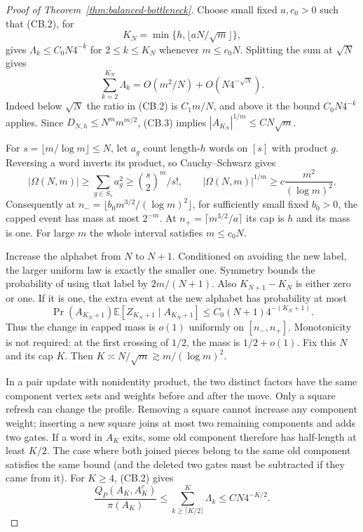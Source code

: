 \begin{proof}[Proof of Theorem~\ref{thm:balanced-bottleneck}]
Choose small fixed $a,c_0>0$ such that (CB.2), for
\[
 K_N=\min\{h,\lfloor aN/\sqrt m\rfloor\},
\]
gives $\Lambda_k\le C_0N4^{-k}$ for $2\le k\le K_N$ whenever
$m\le c_0N$.  Splitting the sum at $\sqrt N$ gives
\[
 \sum_{k=2}^{K_N}\Lambda_k
   =O(m^2/N)+O(N4^{-\sqrt N}).
\]
Indeed below $\sqrt N$ the ratio in (CB.2) is $C_1m/N$, and above it
the bound $C_0N4^{-k}$ applies.  Since $D_{N,h}\le N^m m^{m/2}$,
(CB.3) implies $|A_{K_N}|^{1/m}\le C N\sqrt m$.

For $s=\lfloor m/\log m\rfloor\le N$, let $a_g$ count length-$h$
words on $[s]$ with product $g$.  Reversing a word inverts its product,
so Cauchy--Schwarz gives
\[
 |\Omega(N,m)|\ge\sum_{g\in S_s}a_g^2
       \ge\binom s2^{\!m}/s!,\qquad
 |\Omega(N,m)|^{1/m}\ge c\frac{m^2}{(\log m)^2}.       \tag{CB.4}
\]
Consequently at
$n_- =\lfloor b_0m^{3/2}/(\log m)^2\rfloor$, for sufficiently small
fixed $b_0>0$, the capped event has mass at most $2^{-m}$.  At
$n_+=\lceil m^{3/2}/a\rceil$ its cap is $h$ and its mass is one.
For large $m$ the whole interval satisfies $m\le c_0N$.

Increase the alphabet from $N$ to $N+1$.  Conditioned on avoiding the new
label, the larger uniform law is exactly the smaller one.  Symmetry bounds
the probability of using that label by $2m/(N+1)$.  Also $K_{N+1}-K_N$
is either zero or one.  If it is one, the extra event at the new alphabet
has probability at most
\[
 \Pr(A_{K_N+1})\mathbb E[Z_{K_N+1}\mid A_{K_N+1}]
       \le C_0(N+1)4^{-(K_N+1)}.
\]
Thus the change in capped mass is $o(1)$ uniformly on $[n_-,n_+]$.
Monotonicity is not required: at the first crossing of $1/2$, the mass
is $1/2+o(1)$.  Fix this $N$ and its cap $K$.
Then $K\asymp N/\sqrt m\gtrsim m/(\log m)^2$.

In a pair update with nonidentity product, the two distinct factors have
the same component vertex sets and weights before and after the move.
Only a square refresh can change the profile.  Removing a square cannot
increase any component weight; inserting a new square joins at most two
remaining components and adds two gates.  If a word in $A_K$ exits, some
old component therefore has half-length at least $K/2$.  The case where
both joined pieces belong to the same old component satisfies the same
bound (and the deleted two gates must be subtracted if they came from it).
For $K\ge4$, (CB.2) gives
\[
 \frac{Q_P(A_K,A_K^c)}{\pi(A_K)}
 \le\sum_{k\ge\lceil K/2\rceil}^{K}\Lambda_k
 \le C N4^{-K/2}.                                    \tag{CB.5}
\]


\end{proof}
